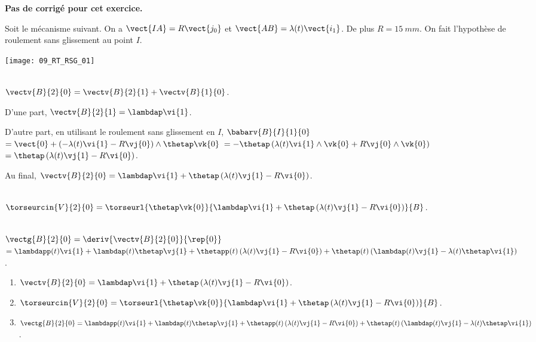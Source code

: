 \normalfalse \difficiletrue \tdifficilefalse
\correctiontrue


\setcounter{question}{0}
\ifcorrection
\else
\textbf{Pas de corrigé pour cet exercice.}
\fi

\ifprof
\else
Soit le mécanisme suivant. On a $\vect{IA}=R\vect{j_0}$ et $\vect{AB}=\lambda(t)\vect{i_1}$. De plus $R=\SI{15}{mm}$.
On fait l'hypothèse de roulement sans glissement au point $I$.
\begin{center}
\texttt{[image: 09\_RT\_RSG\_01]}
\end{center}
\fi


\ifprof ~\\
$\vectv{B}{2}{0}=\vectv{B}{2}{1}+\vectv{B}{1}{0}$.

D'une part,  $\vectv{B}{2}{1}=\lambdap\vi{1}$.

D'autre part, en utilisant le roulement sans glissement en $I$, 
$\babarv{B}{I}{1}{0} $ $=\vect{0}+\left(-\lambda(t)\vi{1}-R\vj{0} \right)\wedge\thetap \vk{0}$
$=-\thetap\left(\lambda(t)\vi{1}\wedge \vk{0}+R\vj{0}\wedge \vk{0} \right)$
$=\thetap\left(\lambda(t)\vj{1}-R\vi{0} \right)$.

Au final, $\vectv{B}{2}{0} = \lambdap\vi{1} + \thetap\left(\lambda(t)\vj{1}-R\vi{0} \right)$.

\else
\fi

\ifprof ~\\
$\torseurcin{V}{2}{0}=\torseurl{\thetap \vk{0}}{ \lambdap\vi{1} + \thetap\left(\lambda(t)\vj{1}-R\vi{0} \right)}{B}$.
\else
\fi

\ifprof ~\\
$\vectg{B}{2}{0} = \deriv{\vectv{B}{2}{0}}{\rep{0}}$
$ = \lambdapp(t)\vi{1} +\lambdap(t)\thetap\vj{1} 
+ \thetapp(t)\left(\lambda(t)\vj{1}-R\vi{0} \right)
+ \thetap(t)\left(\lambdap(t)\vj{1}-\lambda(t)\thetap\vi{1} \right)
$.
\else
\fi

\ifprof
\else
\ifcolle
\else
\begin{solution}
\begin{enumerate}
\item $\vectv{B}{2}{0} = \lambdap\vi{1} + \thetap\left(\lambda(t)\vj{1}-R\vi{0} \right)$.
\item $\torseurcin{V}{2}{0}=\torseurl{\thetap \vk{0}}{ \lambdap\vi{1} + \thetap\left(\lambda(t)\vj{1}-R\vi{0} \right)}{B}$.
\item $\vectg{B}{2}{0}  = \lambdapp(t)\vi{1} +\lambdap(t)\thetap\vj{1} 
+ \thetapp(t)\left(\lambda(t)\vj{1}-R\vi{0} \right)
+ \thetap(t)\left(\lambdap(t)\vj{1}-\lambda(t)\thetap\vi{1} \right)
$.
\end{enumerate} 
\end{solution}
\fi

\fi